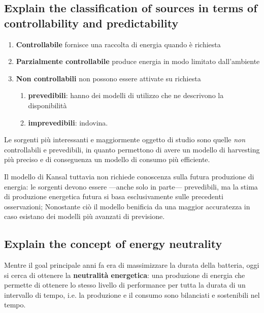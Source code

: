 \subsection{Explain the classification of sources in terms of controllability and predictability}
\begin{enumerate}
   \item \textbf{Controllabile} fornisce una raccolta di energia quando è richiesta
   \item \textbf{Parzialmente controllabile} produce energia in modo limitato dall'ambiente %
   \item \textbf{Non controllabili} non possono essere attivate su richiesta
   \begin{enumerate}
      \item \textbf{prevedibili}: hanno dei modelli di utilizzo che ne descrivono la disponibilità
      \item \textbf{imprevedibili}: indovina.
   \end{enumerate}
\end{enumerate}
Le sorgenti più interessanti e maggiormente oggetto di studio sono quelle \textit{non} controllabili e prevedibili, in quanto permettono di avere un modello di harvesting più preciso e di conseguenza un modello di consumo più efficiente.

Il modello di Kansal tuttavia non richiede conoscenza sulla futura produzione di energia: le sorgenti devono essere ---anche solo in parte--- prevedibili, ma la stima di produzione energetica futura si basa esclusivamente sulle precedenti osservazioni;
Nonostante ciò il modello benificia da una maggior accuratezza in caso esistano dei modelli più avanzati di previsione.


\subsection{Explain the concept of energy neutrality}
Mentre il goal principale anni fa era di massimizzare la durata della batteria, oggi si cerca di ottenere la \textbf{neutralità energetica}: una produzione di energia che permette di ottenere lo stesso livello di performance per tutta la durata di un intervallo di tempo, i.e. la produzione e il consumo sono bilanciati e sostenibili nel tempo.

